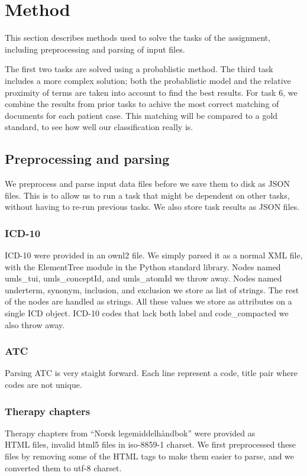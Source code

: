 \chapter{Method}
\label{cha:method}
This section describes methods used to solve the tasks of the assignment, including
preprocessing and parsing of input files. 

The first two tasks are solved using a probablistic method. The third task includes a more complex solution; both the probablistic model and the relative proximity of terms are taken into account to find the best results. For task 6, we combine the results from prior tasks to achive the most correct matching of documents for each patient case. This matching will be compared to a gold standard, to see how well our classification really is. 

\section{Preprocessing and parsing}
We preprocess and parse input data files before we save them to disk as JSON
files. This is to allow us to run a task that might be dependent on other tasks, without having to re-run previous tasks. We also store task
results as JSON files.

\subsection{ICD-10}
ICD-10 were provided in an ownl2 file. We simply parsed it as a normal XML
file, with the ElementTree module in the Python standard library.
Nodes named umls\_tui, umls\_conceptId, and umls\_atomId we throw away.
Nodes named underterm, synonym, inclusion, and exclusion we store as list of
strings. The rest of the nodes are handled as strings. All these values we
store as attributes on a single ICD object. ICD-10 codes that lack both label
and code\_compacted we also throw away.

\subsection{ATC}
Parsing ATC is very staight forward. Each line represent a code, title
pair where codes are not unique.

\subsection{Therapy chapters}
Therapy chapters from ``Norsk legemiddelhåndbok'' were provided as\\
HTML files, invalid html5 files in iso-8859-1 charset. We first preprocessed
these files by removing some of the HTML tags to make them easier to parse,
and we converted them to utf-8 charset.

